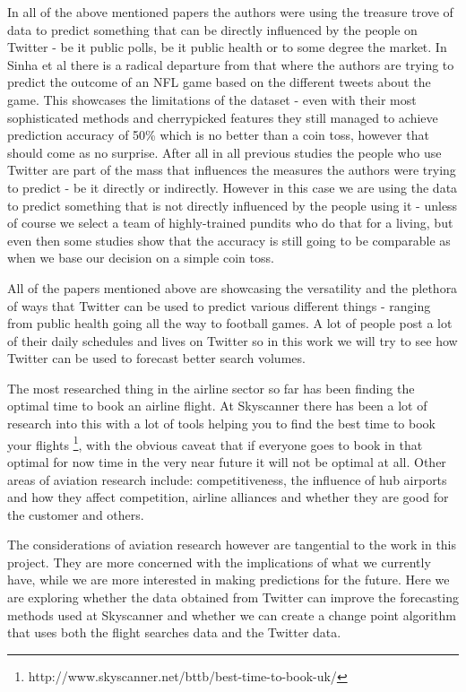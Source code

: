 \documentclass[minf,twoside,singlespacing,parskip,frontabs,notimes,12pt]{infthesis} %
\begin{document}
In all of the above mentioned papers the authors were using the treasure trove of data to predict something that can be directly influenced by the people on Twitter - be it public polls, be it public health or to some degree the market. In Sinha et al\cite{twitnfl} there is a radical departure from that where the authors are trying to predict the outcome of an NFL game based on the different tweets about the game. This showcases the limitations of the dataset - even with their most sophisticated methods and cherrypicked features they still managed to achieve prediction accuracy of 50\% which is no better than a coin toss, however that should come as no surprise. After all in all previous studies the people who use Twitter are part of the mass that influences the measures the authors were trying to predict - be it directly or indirectly. However in this case we are using the data to predict something that is not directly influenced by the people using it - unless of course we select a team of highly-trained pundits who do that for a living, but even then some studies show that the accuracy is still going to be comparable as when we base our decision on a simple coin toss.  

All of the papers mentioned above are showcasing the versatility and the plethora of ways that Twitter can be used to predict various different things - ranging from public health going all the way to football games. A lot of people post a lot of their daily schedules and lives on Twitter so in this work we will try to see how Twitter can be used to forecast better search volumes. 


The most researched thing in the airline sector so far has been finding the optimal time to book an airline flight\cite{Hamletkdd03,ijcai}. At Skyscanner there has been a lot of research into this with a lot of tools helping you to find the best time to book your flights \footnote{http://www.skyscanner.net/bttb/best-time-to-book-uk/}, with the obvious caveat that if everyone goes to book in that optimal for now time in the very near future it will not be optimal at all. 
Other areas of aviation research include: competitiveness, the influence of hub airports and how they affect competition, airline alliances and whether they are good for the customer and others. 


The considerations of aviation research however are tangential to the work in this project. They are more concerned with the implications of what we currently have, while we are more interested in making predictions for the future. Here we are exploring whether the data obtained from Twitter can improve the forecasting methods used at Skyscanner and whether we can create a change point algorithm that uses both the flight searches data and the Twitter data. 
\end{document}
